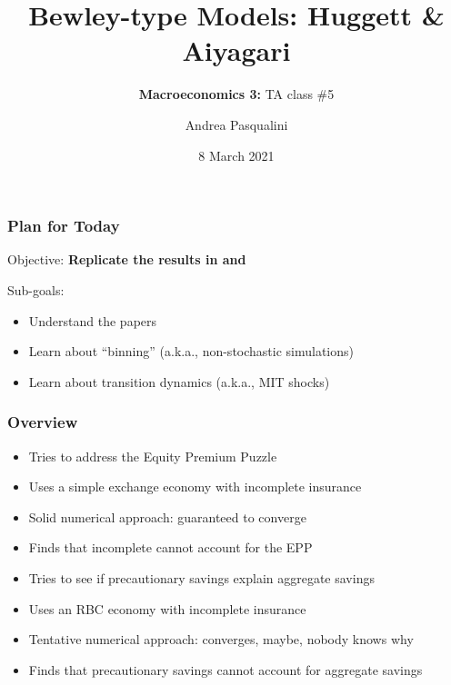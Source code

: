 \documentclass[10pt, aspectratio=1610, natbib, handout]{beamer}
\title[Huggett-Aiyagari]{
  \textbf{Bewley-type Models: Huggett \& Aiyagari}
}
\subtitle[Macro 3: TA\#5]{
  \textbf{Macroeconomics 3:} TA class \#5
}
\author[A.~Pasqualini]{
  Andrea Pasqualini
}
\institute[Bocconi]{Bocconi University}
\date{
  8 March 2021
}
\begin{document}
  \begin{frame}
    \maketitle
  \end{frame}

  \begin{frame}
    \frametitle{Plan for Today}

    Objective: \textbf{Replicate the results in \cite{Huggett1993} and \cite{Aiyagari1994}}

    \vfill\pause

    Sub-goals:
    \begin{itemize}
      \item Understand the papers
      \item Learn about ``binning'' (a.k.a., non-stochastic simulations)
      \item Learn about transition dynamics (a.k.a., MIT shocks)
    \end{itemize}

  \end{frame}

  \begin{frame}
    \frametitle{Overview}

    \cite{Huggett1993}
    \begin{itemize}
      \item Tries to address the Equity Premium Puzzle
      \item Uses a simple exchange economy with incomplete insurance
      \item Solid numerical approach: guaranteed to converge
      \item Finds that incomplete cannot account for the EPP
    \end{itemize}

    \vfill\pause

    \cite{Aiyagari1994}
    \begin{itemize}
      \item Tries to see if precautionary savings explain aggregate savings
      \item Uses an RBC economy with incomplete insurance
      \item Tentative numerical approach: converges, maybe, nobody knows why
      \item Finds that precautionary savings cannot account for aggregate savings
    \end{itemize}

  \end{frame}
\end{document}
